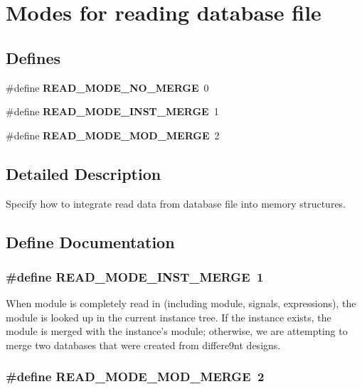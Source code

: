 \section{Modes for reading database file}
\label{group__read__modes}
\subsection*{Defines}
\begin{CompactItemize}
\item 
\#define {\bf READ\_\-MODE\_\-NO\_\-MERGE}\ 0
\item 
\#define {\bf READ\_\-MODE\_\-INST\_\-MERGE}\ 1
\item 
\#define {\bf READ\_\-MODE\_\-MOD\_\-MERGE}\ 2
\end{CompactItemize}


\subsection{Detailed Description}
Specify how to integrate read data from database file into memory structures. 

\subsection{Define Documentation}
\subsubsection{\setlength{\rightskip}{0pt plus 5cm}\#define READ\_\-MODE\_\-INST\_\-MERGE\ 1}\label{group__read__modes_a1}


When module is completely read in (including module, signals, expressions), the module is looked up in the current instance tree. If the instance exists, the module is merged with the instance's module; otherwise, we are attempting to merge two databases that were created from differe9nt designs. 
\subsubsection{\setlength{\rightskip}{0pt plus 5cm}\#define READ\_\-MODE\_\-MOD\_\-MERGE\ 2}\label{group__read__modes_a2}


